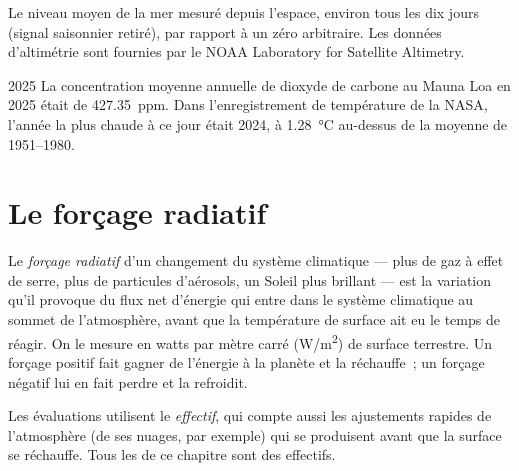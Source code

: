 \begin{omfigure}

{\small Le niveau moyen de la mer mesuré depuis l'espace, environ tous les
dix jours (signal saisonnier retiré), par rapport à un zéro arbitraire. Les
données d'altimétrie sont fournies par le NOAA Laboratory for Satellite
Altimetry.}
\end{omfigure}

\begin{dated}{2025}
La concentration moyenne annuelle de dioxyde de carbone au Mauna Loa en
2025 était de \qty{427.35}{ppm}. Dans l'enregistrement de température de la
NASA, l'année la plus chaude à ce jour était 2024, à
\qty{1.28}{\degreeCelsius} au-dessus de la moyenne de 1951--1980.
\end{dated}

\section{Le forçage radiatif}

\begin{definition}\label{def:g12:climate-change:forcing}
Le \emph{forçage radiatif} d'un
changement du système climatique --- plus de gaz à effet de serre, plus de
particules d'aérosols, un Soleil plus brillant --- est la variation qu'il
provoque du flux net d'énergie qui entre dans le système climatique au
sommet de l'atmosphère, avant que la température de surface ait eu le
temps de réagir. On le mesure en watts par mètre carré (\unit{W/m^2}) de
surface terrestre. Un forçage positif fait gagner de l'énergie à la planète
et la réchauffe~; un forçage négatif lui en fait perdre et la refroidit.
\end{definition}

\begin{remark}\label{rem:g12:climate-change:effective}
Les évaluations utilisent le  \emph{effectif}, qui compte
aussi les ajustements rapides de l'atmosphère (de ses nuages, par exemple)
qui se produisent avant que la surface se réchauffe. Tous les  de
ce chapitre sont des  effectifs.
\end{remark}

